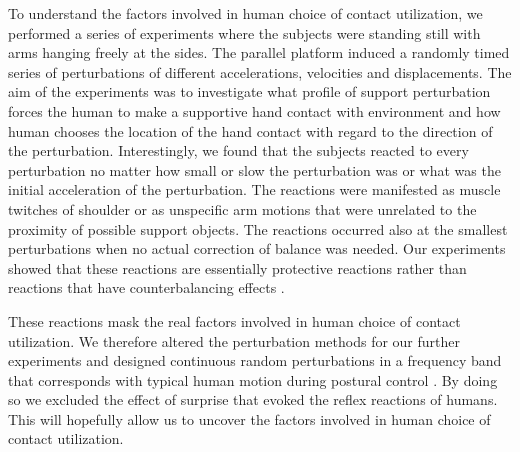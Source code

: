 To understand the factors involved in human choice of contact utilization, we performed a series of experiments where the subjects were standing still with arms hanging freely at the sides. The parallel platform induced a randomly timed series of perturbations of different accelerations, velocities and displacements. The aim of the experiments was to investigate what profile of support perturbation forces the human to make a supportive hand contact with environment and how human chooses the location of the hand contact with regard to the direction of the perturbation. Interestingly, we found that the subjects reacted to every perturbation no matter how small or slow the perturbation was or what was the initial acceleration of the perturbation. The reactions were manifested as muscle twitches of shoulder or as unspecific arm motions that were unrelated to the proximity of possible support objects. The reactions occurred also at the smallest perturbations when no actual correction of balance was needed. Our experiments showed that these reactions are essentially protective reactions rather than reactions that have counterbalancing effects \cite{McIlroy1995, Corbeil2013}.

These reactions mask the real factors involved in human choice of contact utilization. We therefore altered the perturbation methods for our further experiments and designed continuous random perturbations in a frequency band that corresponds with typical human motion during postural control \cite{Nawayseh2006}. By doing so we excluded the effect of surprise that evoked the reflex reactions of humans. This will hopefully allow us to uncover the factors involved in human choice of contact utilization.
